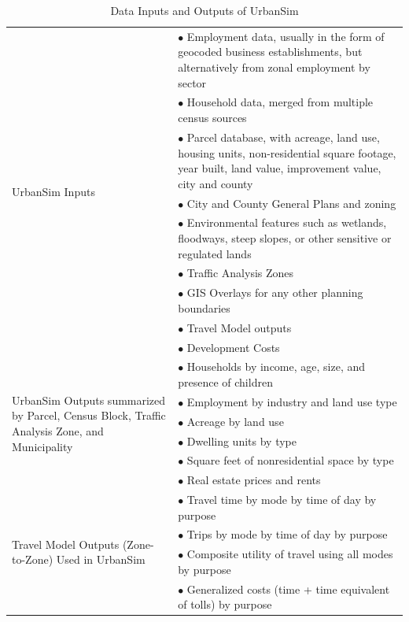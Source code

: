 \begin{table}[htp]
\caption{Data Inputs and Outputs of UrbanSim}
\label{tab:inputs-outputs}
\begin{center}
\begin{tabular}{ p{1.8in}  p{4.4in}  }
\toprule[1.5pt]
\multirow{9}{1.8in}{UrbanSim Inputs}
&   $\bullet$ Employment data, usually in the form of geocoded business establishments, but alternatively from zonal employment by sector\\
&   $\bullet$ Household data, merged from multiple census sources\\
&   $\bullet$  Parcel database, with acreage, land use, housing units, non-residential square footage, year built, land value, improvement value, city and county\\
&   $\bullet$  City and County General Plans and zoning\\
&   $\bullet$  Environmental features such as wetlands, floodways, steep slopes, or other sensitive or regulated lands\\
&   $\bullet$  Traffic Analysis Zones\\
&   $\bullet$   GIS Overlays for any other planning boundaries\\
&   $\bullet$  Travel Model outputs\\
&  $\bullet$   Development Costs \\
\midrule
\multirow{6}{1.8in}{UrbanSim Outputs summarized by Parcel, Census Block, Traffic Analysis Zone, and Municipality}
& $\bullet$    Households by income, age, size, and presence of children\\
& $\bullet$    Employment by industry and land use type\\
& $\bullet$    Acreage by land use\\
& $\bullet$    Dwelling units by type\\
& $\bullet$    Square feet of nonresidential space by type\\
& $\bullet$    Real estate prices and rents\\
\midrule
\multirow{4}{1.8in}{Travel Model Outputs (Zone-to-Zone) Used in UrbanSim}
& $\bullet$    Travel time by mode by time of day by purpose\\
& $\bullet$  Trips by mode by time of day by purpose\\
& $\bullet$    Composite utility of travel using all modes by purpose \\
& $\bullet$  Generalized costs (time + time equivalent of tolls) by purpose \\
\bottomrule
\end{tabular}
\end{center}
\end{table}

